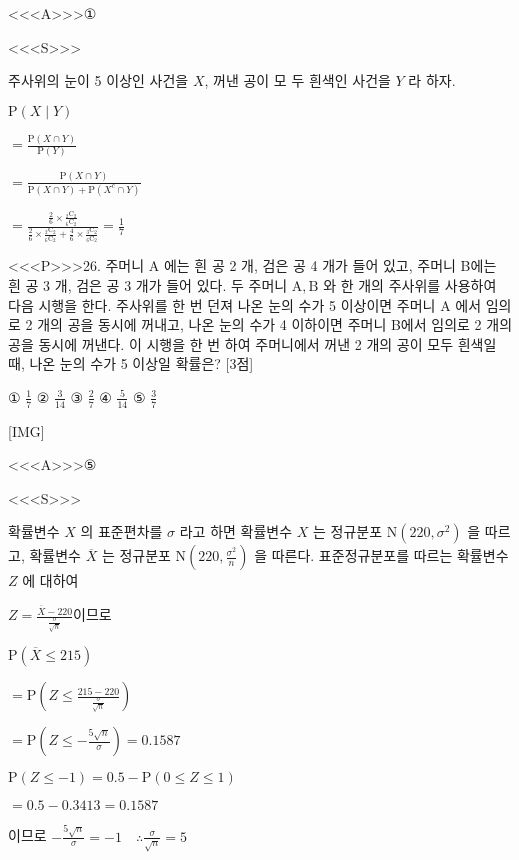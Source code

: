 \documentclass{oblivoir}
\begin{document}
<<<A>>>①

<<<S>>>



주사위의 눈이 5 이상인 사건을 $X$, 꺼낸 공이 모 두 흰색인 사건을 $Y$ 라 하자.

$\mathrm{P}(X \mid Y) $

$=\frac{\mathrm{P}(X \cap Y)}{\mathrm{P}(Y)}$

$=\frac{\mathrm{P}(X \cap Y)}{\mathrm{P}(X \cap Y)+\mathrm{P}\left(X^{c} \cap Y\right)}$

$=\frac{\frac{2}{6} \times \frac{{ }_{2} \mathrm{C}_{2}}{{ }_{6} \mathrm{C}_{2}}}{\frac{2}{6} \times \frac{{ }_{2} \mathrm{C}_{2}}{{ }_{6} \mathrm{C}_{2}}+\frac{4}{6} \times \frac{{ }_{3} \mathrm{C}_{2}}{{ }_{6} \mathrm{C}_{2}}}=\frac{1}{7}$


<<<P>>>26. 주머니 $\mathrm{A}$ 에는 흰 공 2 개, 검은 공 4 개가 들어 있고, 주머니 B에는 흰 공 3 개, 검은 공 3 개가 들어 있다.
두 주머니 $\mathrm{A}, \mathrm{B}$ 와 한 개의 주사위를 사용하여 다음 시행을 한다.
주사위를 한 번 던져
나온 눈의 수가 5 이상이면
주머니 $\mathrm{A}$ 에서 임의로 2 개의 공을 동시에 꺼내고,
나온 눈의 수가 4 이하이면
주머니 B에서 임의로 2 개의 공을 동시에 꺼낸다.
이 시행을 한 번 하여 주머니에서 꺼낸 2 개의 공이 모두 흰색일 때, 나온 눈의 수가 5 이상일 확률은? [3점]

① $\frac{1}{7}$
② $\frac{3}{14}$
③ $\frac{2}{7}$
④ $\frac{5}{14}$
⑤ $\frac{3}{7}$

[IMG]

<<<A>>>⑤

<<<S>>>



확률변수 $X$ 의 표준편차를 $\sigma$ 라고 하면
확률변수 $X$ 는 정규분포 $\mathrm{N}\left(220, \sigma^{2}\right)$ 을 따르고,
확률변수 $\overline{X}$ 는 정규분포 $\mathrm{N}\left(220, \frac{\sigma^{2}}{n}\right)$ 을 따른다.
표준정규분포를 따르는 확률변수 $Z$ 에 대하여

$Z=\frac{\overline{X}-220}{\frac{\sigma}{\sqrt{n}}}$이므로

$\mathrm{P}(\overline{X} \leq 215) $

$=\mathrm{P}\left(Z \leq \frac{215-220}{\frac{\sigma}{\sqrt{n}}}\right)$

$=\mathrm{P}\left(Z \leq-\frac{5 \sqrt{n}}{\sigma}\right)=0.1587$

$\mathrm{P}(Z \leq-1)=0.5-\mathrm{P}(0 \leq Z \leq 1)$

$= 0.5-0.3413=0.1587$

이므로 $-\frac{5 \sqrt{n}}{\sigma}=-1 \quad \therefore \frac{\sigma}{\sqrt{n}}=5$
\end{document}
